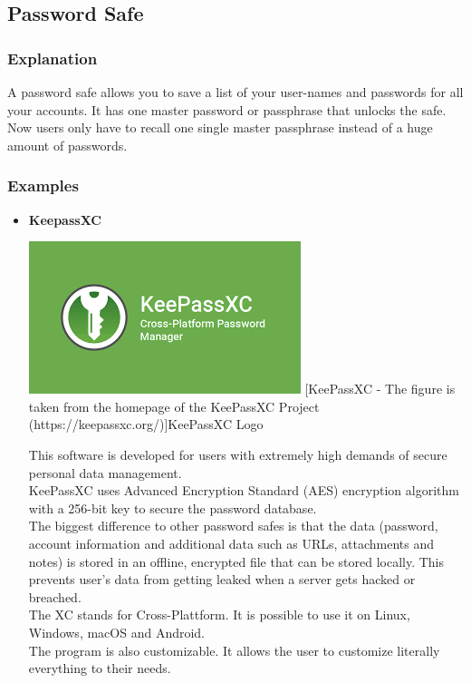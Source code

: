 \documentclass[conference]{IEEEtran}
\begin{document}
\subsection{Password Safe}
\subsubsection{Explanation}
A password safe allows you to save a list of your user-names and passwords for all your accounts. It has one master password or passphrase that unlocks the safe. Now users only have to recall one single master passphrase instead of a huge amount of passwords.
\subsubsection{Examples}
\begin{itemize}
\item \textbf{KeepassXC}\\ 
\begin{center}
\includegraphics[scale=0.6]{./images/KeePass.png}
[KeePassXC - The figure is taken from the homepage of the KeePassXC Project (https://keepassxc.org/)]{KeePassXC Logo}
\end{center}

This software is developed for users with extremely high demands of secure personal data management. \\
KeePassXC uses Advanced Encryption Standard (AES) encryption algorithm with a 256-bit key to secure the password database.\\
The biggest difference to other password safes is that the data (password, account information and additional data such as URLs, attachments and notes) is stored in an offline, encrypted file that can be stored locally. This prevents user's data from getting leaked when a server gets hacked or breached.\\
The XC stands for Cross-Plattform. It is possible to use it on Linux, Windows, macOS and Android.\\
The program is also customizable. It allows the user to customize literally everything to their needs.\cite{b6}\\



\end{itemize}
\end{document}
